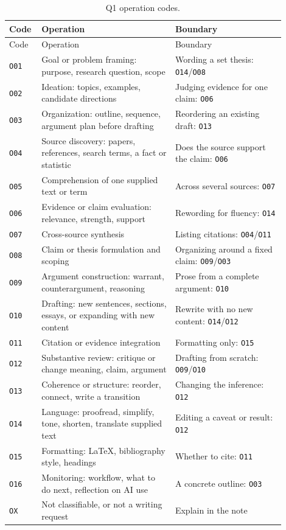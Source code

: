 \documentclass[manuscript,screen]{acmart}
\newcommand{\code}[1]{\texttt{#1}}
\begin{document}
\begin{longtable}{p{0.08\linewidth}p{0.45\linewidth}p{0.37\linewidth}}
\caption{Q1 operation codes.}\\
\toprule
Code & Operation & Boundary \\
\midrule
\endfirsthead
\toprule
Code & Operation & Boundary \\
\midrule
\endhead
\code{O01} & Goal or problem framing: purpose, research question, scope & Wording a set thesis: \code{O14}/\code{O08} \\
\code{O02} & Ideation: topics, examples, candidate directions & Judging evidence for one claim: \code{O06} \\
\code{O03} & Organization: outline, sequence, argument plan before drafting & Reordering an existing draft: \code{O13} \\
\code{O04} & Source discovery: papers, references, search terms, a fact or statistic & Does the source support the claim: \code{O06} \\
\code{O05} & Comprehension of one supplied text or term & Across several sources: \code{O07} \\
\code{O06} & Evidence or claim evaluation: relevance, strength, support & Rewording for fluency: \code{O14} \\
\code{O07} & Cross-source synthesis & Listing citations: \code{O04}/\code{O11} \\
\code{O08} & Claim or thesis formulation and scoping & Organizing around a fixed claim: \code{O09}/\code{O03} \\
\code{O09} & Argument construction: warrant, counterargument, reasoning & Prose from a complete argument: \code{O10} \\
\code{O10} & Drafting: new sentences, sections, essays, or expanding with new content & Rewrite with no new content: \code{O14}/\code{O12} \\
\code{O11} & Citation or evidence integration & Formatting only: \code{O15} \\
\code{O12} & Substantive review: critique or change meaning, claim, argument & Drafting from scratch: \code{O09}/\code{O10} \\
\code{O13} & Coherence or structure: reorder, connect, write a transition & Changing the inference: \code{O12} \\
\code{O14} & Language: proofread, simplify, tone, shorten, translate supplied text & Editing a caveat or result: \code{O12} \\
\code{O15} & Formatting: LaTeX, bibliography style, headings & Whether to cite: \code{O11} \\
\code{O16} & Monitoring: workflow, what to do next, reflection on AI use & A concrete outline: \code{O03} \\
\code{OX} & Not classifiable, or not a writing request & Explain in the note \\
\bottomrule
\end{longtable}
\end{document}
